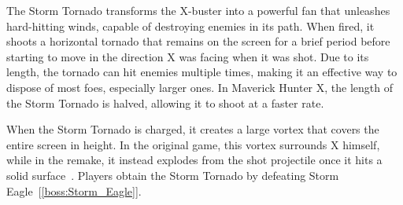 The Storm Tornado transforms the X-buster into a powerful fan that unleashes hard-hitting winds, capable of destroying enemies in its path. When fired, it shoots a horizontal tornado that remains on the screen for a brief period before starting to move in the direction X was facing when it was shot. Due to its length, the tornado can hit enemies multiple times, making it an effective way to dispose of most foes, especially larger ones. In Maverick Hunter X, the length of the Storm Tornado is halved, allowing it to shoot at a faster rate.

When the Storm Tornado is charged, it creates a large vortex that covers the entire screen in height. In the original game, this vortex surrounds X himself, while in the remake, it instead explodes from the shot projectile once it hits a solid surface~\cite{wiki:Storm_tornado}. Players obtain the Storm Tornado by defeating Storm Eagle~[\ref{boss:Storm_Eagle}]. 
